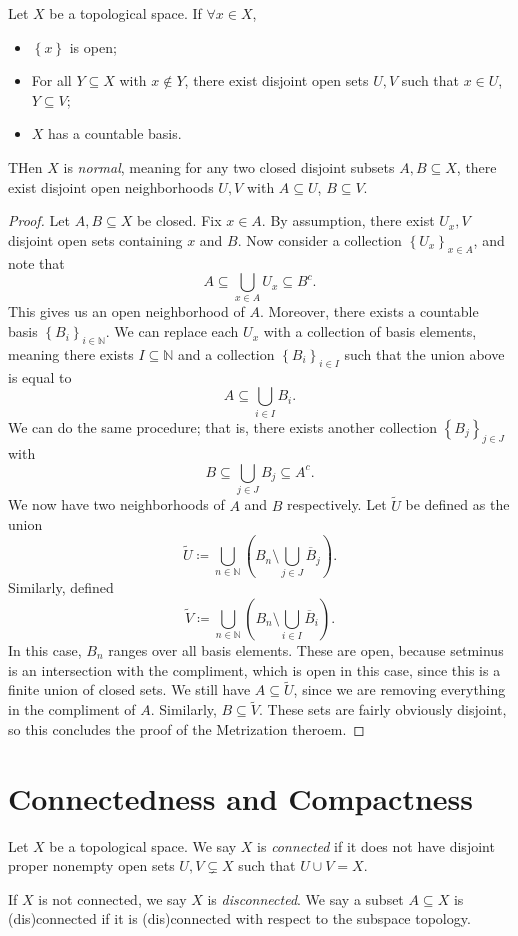 \begin{lemma}\label{lma:3.2}
	Let $X$ be a topological space. If $\forall x\in X$,
	\begin{itemize}
		\item $\left\{ x \right\} $ is open;
		\item For all $Y\subseteq X$ with $x\notin Y$, there exist disjoint open sets $U,V$ such that $x\in U$, $Y\subseteq V$;
		\item $X$ has a countable basis.
	\end{itemize}
	THen $X$ is \emph{normal}, meaning for any two closed disjoint subsets $A,B\subseteq X$, there exist disjoint open neighborhoods $U,V$ with $A\subseteq U$, $B\subseteq V$.
\end{lemma}
\begin{proof}
	Let $A,B\subseteq X$ be closed. Fix $x\in A$. By assumption, there exist $U_x,V$ disjoint open sets containing $x$ and $B$. Now consider a collection $\left\{ U_x \right\}_{x\in A} $, and note that
	\[
		A\subseteq \bigcup_{x\in A} U_x \subseteq B^{c} 
	.\]
	This gives us an open neighborhood of $A$. Moreover, there exists a countable basis $\left\{ B_i \right\}_{i\in \mathbb{N} }$. We can replace each $U_x$ with a collection of basis elements, meaning there exists $I\subseteq \mathbb{N} $ and a collection $\left\{ B_i \right\}_{i\in I} $ such that the union above is equal to
	\[
		A\subseteq \bigcup_{i\in I} B_i
	.\]
	We can do the same procedure; that is, there exists another collection $\left\{ B_j \right\}_{j\in J} $ with
	\[
		B\subseteq \bigcup_{j\in J} B_j \subseteq A^{c} 
	.\]
	We now have two neighborhoods of $A$ and $B$ respectively. Let $\widetilde{U} $ be defined as the union
	\[
		\widetilde{U} \coloneqq \bigcup_{n\in\mathbb{N} } \left( B_n\setminus \bigcup_{j\in J} \overline{B} _j \right) 
	.\]
	Similarly, defined
	\[
		\widetilde{V} \coloneqq \bigcup_{n\in\mathbb{N} } \left( B_n\setminus \bigcup_{i\in I} \overline{B} _i \right) 
	.\]
	In this case, $B_n$ ranges over all basis elements. These are open, because setminus is an intersection with the compliment, which is open in this case, since this is a finite union of closed sets. We still have $A\subseteq \widetilde{U} $, since we are removing everything in the compliment of $A$. Similarly, $B\subseteq \widetilde{V} $. These sets are fairly obviously disjoint, so this concludes the proof of the Metrization theroem.
\end{proof}

\chapter{Connectedness and Compactness}
\begin{definition}[Connected]\label{dfn:4.1}
	Let $X$ be a topological space. We say $X$ is \emph{connected} if it does not have disjoint proper nonempty open sets $U,V\subsetneq X$ such that $U\cup V=X$.

	If $X$ is not connected, we say $X$ is \emph{disconnected}. We say a subset $A\subseteq X$ is (dis)connected if it is (dis)connected with respect to the subspace topology.
\end{definition}

